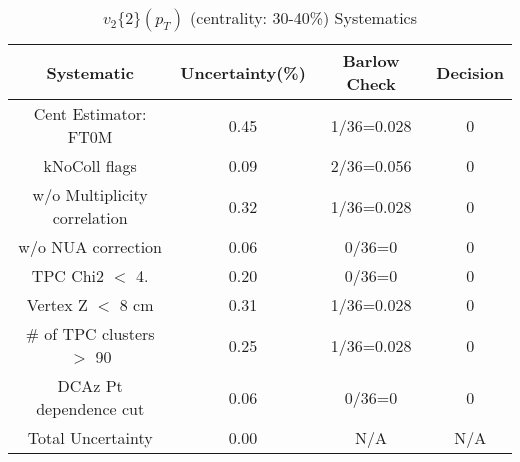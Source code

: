 \begin{table}[htbp]
\caption{$v_2\{2\}(p_{T})$ (centrality: 30-40\%) Systematics}
\label{tab:Sys_pTDiffv2}
\centering
\begin{tabular}{|c|c|c|c|}
\hline
Systematic & Uncertainty(\%) & Barlow Check & Decision \\
\hline
Cent Estimator: FT0M & 0.45 & 1/36=0.028 & 0 \\
kNoColl flags & 0.09 & 2/36=0.056 & 0 \\
w/o Multiplicity correlation & 0.32 & 1/36=0.028 & 0 \\
w/o NUA correction & 0.06 & 0/36=0 & 0 \\
TPC Chi2 $<$ 4. & 0.20 & 0/36=0 & 0 \\
Vertex Z $<$ 8 cm & 0.31 & 1/36=0.028 & 0 \\
\# of TPC clusters $>$ 90 & 0.25 & 1/36=0.028 & 0 \\
DCAz Pt dependence cut & 0.06 & 0/36=0 & 0 \\
\hline
Total Uncertainty & 0.00 & N/A & N/A \\
\hline
\end{tabular}
\end{table}
